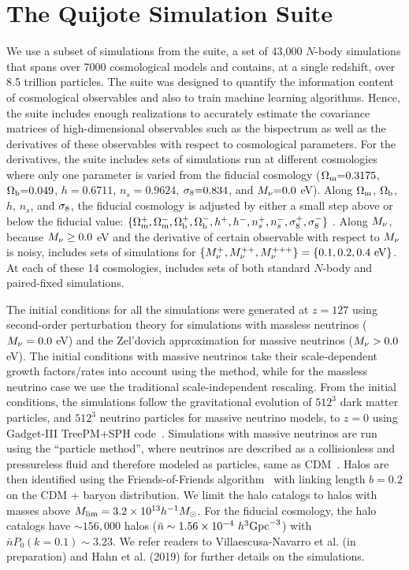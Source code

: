 \section{The Quijote Simulation Suite} \label{sec:sims}
We use a subset of simulations from the \quij suite, a set of 43,000 $N$-body 
simulations that spans over 7000 cosmological models and contains, at a single 
redshift, over 8.5 trillion particles. The \quij suite was designed to quantify
the information content of cosmological observables and also to train machine 
learning algorithms. Hence, the suite includes enough realizations to accurately 
estimate the covariance matrices of high-dimensional observables such as the 
bispectrum as well as the derivatives of these observables with respect to 
cosmological parameters. For the derivatives, the suite includes sets of 
simulations run at different cosmologies where only one parameter is varied 
from the fiducial cosmology  
($\Omega_{\rm m}{=}0.3175$, $\Omega_{\rm b}{=}0.049$, $h{=}0.6711$, $n_s{=}0.9624$, $\sigma_8{=}0.834$, 
and $M_\nu{=}0.0$ eV). Along $\Omega_{\rm m}$, $\Omega_{\rm b}$, $h$, $n_s$, and $\sigma_8$, the fiducial 
cosmology is adjusted by either a small step above or below the fiducial value:
$\{\Omega_{\rm m}^{+}, \Omega_{\rm m}^{-}, \Omega_{\rm b}^{+}, \Omega_{\rm b}^{-}, h^+, h^-, n_s^{+}, n_s^{-}, \sigma_8^{+}, \sigma_8^-\}$ . 
Along $M_\nu$, because $M_\nu \ge 0.0$ eV and the derivative of certain observable 
with respect to $M_\nu$ is noisy, \quij includes sets of simulations for 
$\{M_\nu^{+}, M_\nu^{++}, M_\nu^{+++} \} = \{0.1, 0.2, 0.4~{\rm eV}\}$.
At each of these 14 cosmologies, \quij includes sets of both standard $N$-body and 
paired-fixed simulations. 

The initial conditions for all the simulations were generated at $z=127$ using 
second-order perturbation theory for simulations with massless neutrinos 
($M_\nu = 0.0$ eV) and the Zel’dovich approximation for massive neutrinos 
($M_\nu > 0.0$ eV). The initial conditions with massive neutrinos take 
their scale-dependent growth factors/rates into account using the 
\cite{zennaro2017a} method, while for the massless neutrino case we use 
the traditional scale-independent rescaling. From the initial conditions, 
the simulations follow the gravitational evolution of $512^3$ dark matter 
particles, and $512^3$ neutrino particles for massive neutrino models, 
to $z=0$ using {\sc Gadget-III} TreePM+SPH code~\citep{springel2005}. 
Simulations with massive neutrinos are run using the ``particle method'', 
where neutrinos are described as a collisionless and pressureless fluid 
and therefore modeled as particles, same as CDM~\citep{brandbyge2008,viel2010}.
Halos are then identified using the Friends-of-Friends algorithm~\citep[FoF;][]{davis1985} 
with linking length $b=0.2$ on the CDM + baryon distribution. We limit 
the halo catalogs to halos with masses above 
$M_{\rm lim} = 3.2\times 10^{13} h^{-1}M_\odot$.
For the fiducial cosmology, the halo catalogs have ${\sim}156,000$ halos 
($\bar{n} \sim 1.56 \times 10^{-4}~h^3{\rm Gpc}^{-3}$) with $\bar{n} P_0(k=0.1)\sim 3.23$. 
We refer readers to Villaescusa-Navarro et al. (in preparation) and Hahn et al. (2019) 
for further details on the \quij simulations.
